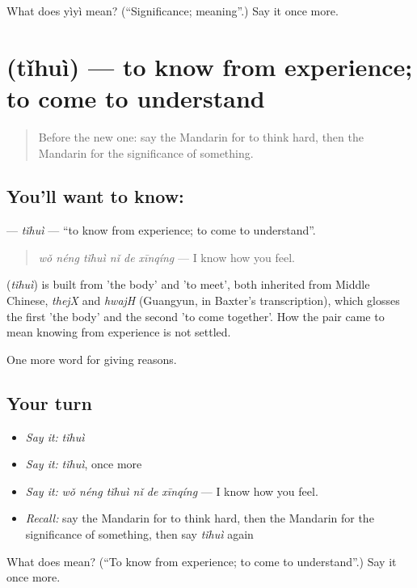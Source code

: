 \begin{tcolorbox}[breakable,colback=teal!4,colframe=teal!35!black,title={Before you move on}]
What does yìyì mean? (\textquotedblleft{}Significance; meaning\textquotedblright{}.) Say it once more.
\end{tcolorbox}
\section[\texorpdfstring{\zh{体会} (tǐhuì)}{体会 (tǐhuì)}]{ (tǐhuì) — to know from experience; to come to understand}

\label{lesson:ZH-C347-tihui}



\begin{quote}
Before the new one: say the Mandarin for to think hard, then the Mandarin for the significance of something.
\end{quote}

\subsection*{You'll want to know: }
\textbf{} — \emph{tǐhuì} — \textquotedblleft{}to know from experience; to come to understand\textquotedblright{}.

\begin{quote}
\emph{wǒ néng tǐhuì nǐ de xīnqíng} — I know how you feel.
\end{quote}

\begin{cousinweb}
\textbf{} (\emph{tǐhuì}) is built from  'the body' and  'to meet', both inherited from Middle Chinese, \emph{thejX} and \emph{hwajH} (Guangyun, in Baxter's transcription), which glosses the first 'the body' and the second 'to come together'. How the pair came to mean knowing from experience is not settled.
\end{cousinweb}

\begin{grammarlens}[title={What you've built}]
One more word for giving reasons.
\end{grammarlens}

\subsection*{Your turn}
\begin{itemize}
\raggedright
  \item \emph{Say it:} \emph{tǐhuì}
  \item \emph{Say it:} \emph{tǐhuì}, once more
  \item \emph{Say it:} \emph{wǒ néng tǐhuì nǐ de xīnqíng} — I know how you feel.
  \item \emph{Recall:} say the Mandarin for to think hard, then the Mandarin for the significance of something, then say \emph{tǐhuì} again
\end{itemize}

\begin{tcolorbox}[breakable,colback=teal!4,colframe=teal!35!black,title={Before you move on}]
What does  mean? (\textquotedblleft{}To know from experience; to come to understand\textquotedblright{}.) Say it once more.
\end{tcolorbox}
